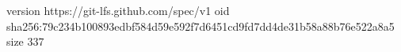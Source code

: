version https://git-lfs.github.com/spec/v1
oid sha256:79c234b100893edbf584d59e592f7d6451cd9fd7dd4de31b58a88b76e522a8a5
size 337
